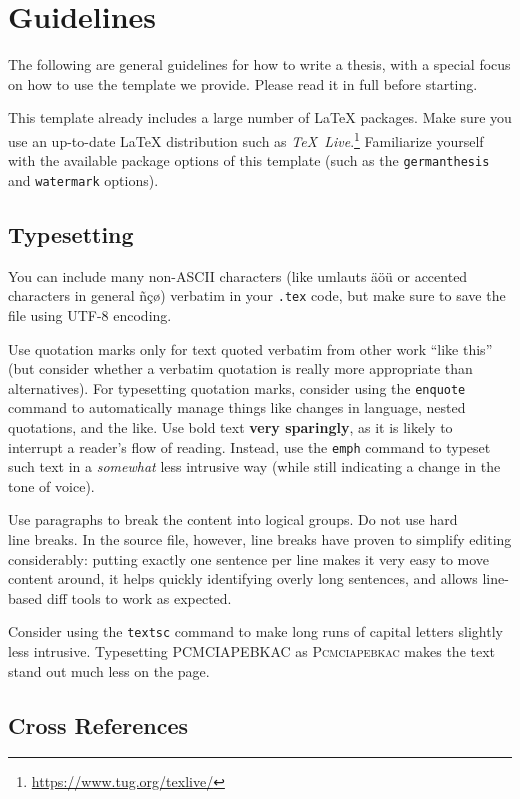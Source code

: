 \chapter{Guidelines}

The following are general guidelines for how to write a thesis, with a special focus on how to use the template we provide.
Please read it in full before starting.

This template already includes a large number of LaTeX packages.
Make sure you use an up-to-date LaTeX distribution such as \emph{TeX~Live}.\footnote{\url{https://www.tug.org/texlive/}}
Familiarize yourself with the available package options of this template (such as the \texttt{germanthesis} and \texttt{watermark} options).


\section{Typesetting}

You can include many non-ASCII characters (like umlauts äöü or accented characters in general ñçø) verbatim in your \texttt{.tex} code, but make sure to save the file using UTF-8 encoding.

Use quotation marks only for text quoted verbatim from other work \enquote{like this} (but consider whether a verbatim quotation is really more appropriate than alternatives).
For typesetting quotation marks, consider using the \texttt{enquote} command to automatically manage things like changes in language, nested quotations, and the like.
Use bold text \textbf{very sparingly}, as it is likely to interrupt a reader's flow of reading.
Instead, use the \texttt{emph} command to typeset such text in a \emph{somewhat} less intrusive way (while still indicating a change in the tone of voice).

Use paragraphs to break the content into logical groups.
Do not use hard\\ line breaks.
In the source file, however, line breaks have proven to simplify editing considerably: putting exactly one sentence per line makes it very easy to move content around, it helps quickly identifying overly long sentences, and allows line-based diff tools to work as expected.

Consider using the \texttt{textsc} command to make long runs of capital letters slightly less intrusive.
Typesetting PCMCIAPEBKAC as \textsc{Pcmciapebkac} makes the text stand out much less on the page.


\section{Cross References}
\label{sec:cross-ref}

